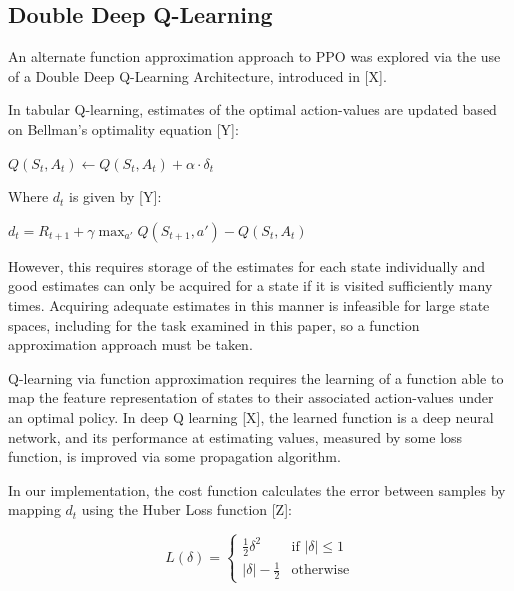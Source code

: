 \documentclass{article}
\begin{document}
     	\subsection{Double Deep Q-Learning}

        An alternate function approximation approach to PPO was explored via the use of a Double Deep Q-Learning Architecture, introduced in [X].

        In tabular Q-learning, estimates of the optimal action-values are updated based on Bellman's optimality equation [Y]:
        \\
        \begin{center}
        $Q(S_{t}, A_{t}) \leftarrow Q(S_{t}, A_{t}) + \alpha\cdot\delta_{t}$
	\end{center}

        Where $d_{t}$ is given by [Y]:
        
        \begin{center}
        $d_{t} = R_{t+1} + \gamma\max_{a'}Q(S_{t+1}, a') - Q(S_{t}, A_{t})$
	\end{center}
        
        However, this requires storage of the estimates for each state individually and good estimates can only be acquired for a state if it is visited sufficiently many times. Acquiring adequate estimates in this manner is infeasible for large state spaces, including for the task examined in this paper, so a function approximation approach must be taken.

        Q-learning via function approximation requires the learning of a function able to map the feature representation of states to their associated action-values under an optimal policy. In deep Q learning [X], the learned function is a deep neural network, and its performance at estimating values, measured by some loss function, is improved via some propagation algorithm.

        In our implementation, the cost function calculates the error between samples by mapping $d_{t}$ using the Huber Loss function [Z]:
            
        \begin{equation}
        L(\delta)=
            \begin{cases}
                \frac{1}{2}\delta^{2} & \text{if  } |\delta| \leq 1\\
                |\delta| - \frac{1}{2} & \text{otherwise} 
            \end{cases}
        \end{equation}
\end{document}
